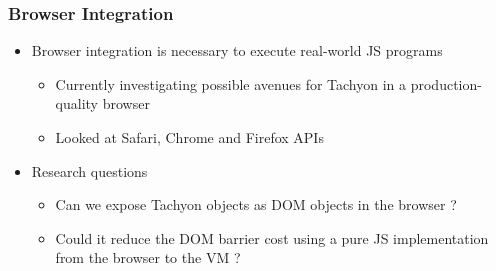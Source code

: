 \begin{frame}
\frametitle{\bf Browser Integration}

    \begin{itemize}
        \item Browser integration is necessary to execute real-world JS programs
        \begin{itemize}
            \item Currently investigating possible avenues for Tachyon in a
        production-quality browser
            \item Looked at Safari, Chrome and Firefox APIs
        \end{itemize}
        \item Research questions
        \begin{itemize}
            \item Can we expose Tachyon objects as DOM objects in the browser ?
            \item Could it reduce the DOM barrier cost using a pure JS
            implementation from the browser to the VM ?
        \end{itemize}
    \end{itemize}
\end{frame}

